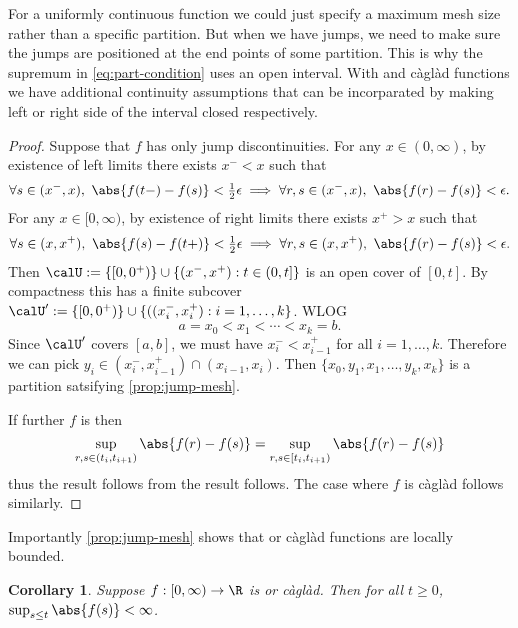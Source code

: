 \documentclass{scrreprt}
\theoremstyle{mydefn}
\newtheorem{corollary}{Corollary}
\theoremstyle{remark}
\newcommand{\caglad}{c\`agl\`ad}
\newcommand\defeq{:=}
\begin{document}
For a uniformly continuous function we could just specify a maximum mesh size rather than a specific partition. But when we have jumps, we need to make sure the jumps are positioned at the end points of some partition. This is why the supremum in \vref{eq:part-condition} uses an open interval. With \cadlag{} and \caglad{} functions we have additional continuity assumptions that can be incorparated by making left or right side of the interval closed respectively.

\begin{proof}
	Suppose that $f$ has only jump discontinuities. For any $x \in (0, \infty)$, by existence of left limits there exists $x^- < x$ such that
	\begin{equation}
		\forall s \in (x^-, x),\ \abs{f(t-) - f(s)} < \tfrac{1}{2} \epsilon \implies
		\forall r, s \in (x^-, x),\ \abs{f(r) - f(s)} < \epsilon.
	\end{equation}
	For any $x \in [0, \infty)$, by existence of right limits there exists $x^+ > x$ such that 
	\begin{equation}
		\forall s \in (x, x^+),\ \abs{f(s) - f(t+)} < \tfrac{1}{2} \epsilon \implies
		\forall r, s \in (x, x^+),\ \abs{f(r) - f(s)} < \epsilon.
	\end{equation}
	Then $\calU \defeq \{[0, 0^+)\} \cup \{(x^-, x^+) : t \in (0, t]\}$ is an open cover of $[0, t]$. By compactness this has a finite subcover $\calU' \defeq \{[0, 0^+)\} \cup \{((x_i^-, x_i^+) : i = 1, \ldots, k\}$. WLOG 
	\begin{equation}
		a = x_0 < x_1 < \cdots < x_k = b.
	\end{equation}
	Since $\calU'$ covers $[a, b]$, we must have $x_i^- < x_{i-1}^+$ for all $i = 1, \ldots, k$. Therefore we can pick $y_i \in (x_i^-, x_{i-1}^+) \cap (x_{i-1}, x_i)$. Then $\{x_0, y_1, x_1, \ldots, y_k, x_k\}$ is a partition satsifying \vref{prop:jump-mesh}.

	If further $f$ is \cadlag{} then 
	\begin{equation}
		\sup_{r, s \in (t_i, t_{i+1})} \abs{f(r) - f(s)} =
		\sup_{r, s \in [t_i, t_{i+1})} \abs{f(r) - f(s)}
	\end{equation}
	thus the result follows from the result follows. The case where $f$ is \caglad{} follows similarly.
\end{proof}

Importantly \vref{prop:jump-mesh} shows that \cadlag{} or \caglad{} functions are locally bounded.

\begin{corollary}
	Suppose $f: [0, \infty) \to \R$ is \cadlag{} or \caglad{}. Then for all $t \geq 0$, $\sup_{s \leq t} \abs{f(s)} < \infty$.
\end{corollary}
\end{document}
